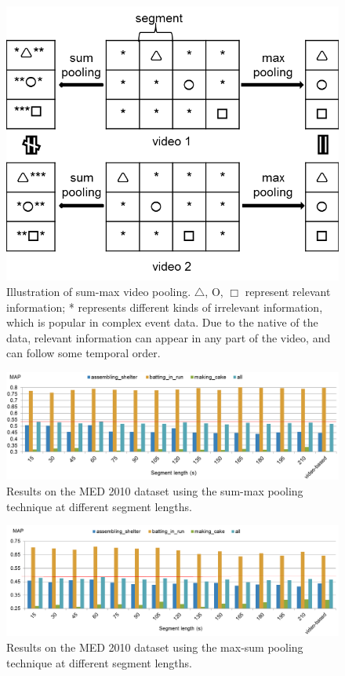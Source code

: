 \begin{figure}[!htb]
	\centering
	\includegraphics[width=1\textwidth]{sum_max.png}
	\caption{Illustration of sum-max video pooling. $\triangle$, O, $\Box$ represent relevant information; * represents different kinds of irrelevant information, which is popular in complex event data. Due to the native of the data, relevant information can appear in any part of the video, and can follow some temporal order. }
	\label{f_sum_max}
\end{figure}
\begin{figure}[!htb]
	\centering
	\includegraphics[width=1\textwidth]{sum_max_chart.png}
	\caption{Results on the MED 2010 dataset using the sum-max pooling technique at different segment lengths.}
	\label{f_sum_max_chart}
\end{figure}
\begin{figure}[!htb]
	\centering
	\includegraphics[width=1\textwidth]{max_sum_chart.png}
	\caption{Results on the MED 2010 dataset using the max-sum pooling technique at different segment lengths.}
	\label{f_max_sum_chart}
\end{figure}
